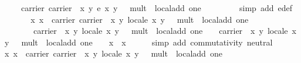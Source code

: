 \begin{isabellebody}
\ \ \ \ {\isasymin}\ carrier\ {\isasymlparr}carrier\ {\isacharequal}\ {\isacharbraceleft}{\isacharparenleft}x{\isacharcomma}\ y{\isacharparenright}{\isachardot}\ e\ x\ y\ {\isacharequal}\ {}{\isacharbraceright}{\isacharcomma}\ mult\ {\isacharequal}\ local{\isachardot}add{\isacharcomma}\ one\ {\isacharequal}\ {\isacharparenleft}{}{\isacharcomma}\ {}{\isacharparenright}{\isasymrparr}{\isachardoublequoteclose}\isanewline
\ \ \ \ \isamarkupfalse%
\ {\isacharparenleft}simp\ add{\isacharcolon}\ e{\isacharunderscore}def{\isacharparenright}\isanewline
{}\isamarkupfalse%
\isanewline
\ \ \isamarkupfalse%
\ {\isachardoublequoteopen}\isanewline
\ \ \ {\isasymAnd}x{\isachardot}\ x\ {\isasymin}\ carrier\ {\isasymlparr}carrier\ {\isacharequal}\ {\isacharbraceleft}{\isacharparenleft}x{\isacharcomma}\ y{\isacharparenright}{\isachardot}\ local{\isachardot}e\ x\ y\ {\isacharequal}\ {}{\isacharbraceright}{\isacharcomma}\ mult\ {\isacharequal}\ local{\isachardot}add{\isacharcomma}\ one\ {\isacharequal}\ {\isacharparenleft}{}{\isacharcomma}\ {}{\isacharparenright}{\isasymrparr}\ {\isasymLongrightarrow}\isanewline
\ \ \ \ \ \ \ \ {\isasymone}\isactrlbsub {\isasymlparr}carrier\ {\isacharequal}\ {\isacharbraceleft}{\isacharparenleft}x{\isacharcomma}\ y{\isacharparenright}{\isachardot}\ local{\isachardot}e\ x\ y\ {\isacharequal}\ {}{\isacharbraceright}{\isacharcomma}\ mult\ {\isacharequal}\ local{\isachardot}add{\isacharcomma}\ one\ {\isacharequal}\ {\isacharparenleft}{}{\isacharcomma}\ {}{\isacharparenright}{\isasymrparr}\isactrlesub \ {\isasymotimes}\isactrlbsub {\isasymlparr}carrier\ {\isacharequal}\ {\isacharbraceleft}{\isacharparenleft}x{\isacharcomma}\ y{\isacharparenright}{\isachardot}\ local{\isachardot}e\ x\ y\ {\isacharequal}\ {}{\isacharbraceright}{\isacharcomma}\ mult\ {\isacharequal}\ local{\isachardot}add{\isacharcomma}\ one\ {\isacharequal}\ {\isacharparenleft}{}{\isacharcomma}\ {}{\isacharparenright}{\isasymrparr}\isactrlesub \ x\ {\isacharequal}\ x{\isachardoublequoteclose}\isanewline
\ \ \ \ \isamarkupfalse%
\ {\isacharparenleft}simp\ add{\isacharcolon}\ commutativity\ neutral{\isacharparenright}\isanewline
{}\isamarkupfalse%
\isanewline
\ \ \isamarkupfalse%
\ {\isachardoublequoteopen}{\isasymAnd}x{\isachardot}\ x\ {\isasymin}\ carrier\ {\isasymlparr}carrier\ {\isacharequal}\ {\isacharbraceleft}{\isacharparenleft}x{\isacharcomma}\ y{\isacharparenright}{\isachardot}\ local{\isachardot}e\ x\ y\ {\isacharequal}\ {}{\isacharbraceright}{\isacharcomma}\ mult\ {\isacharequal}\ local{\isachardot}add{\isacharcomma}\ one\ {\isacharequal}\ {\isacharparenleft}{}{\isacharcomma}\ {}{\isacharparenright}{\isasymrparr}\ {\isasymLongrightarrow}\isanewline

\end{isabellebody}
